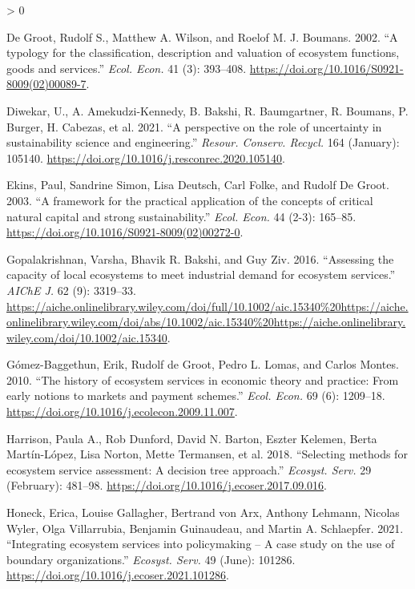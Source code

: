 \documentclass[
]{article}
\newlength{\cslhangindent}
\newenvironment{CSLReferences}[2] %
 {%
  \setlength{\parindent}{0pt}
  \ifodd #1 \everypar{\setlength{\hangindent}{\cslhangindent}}\ignorespaces\fi
  \ifnum #2 > 0
  \setlength{\parskip}{#2\baselineskip}
  \fi
 }%
 {}
\begin{document}
\begin{CSLReferences}{1}{0}
\leavevmode\hypertarget{ref-DeGroot2002}{}%
De Groot, Rudolf S., Matthew A. Wilson, and Roelof M. J. Boumans. 2002. {``{A typology for the classification, description and valuation of ecosystem functions, goods and services}.''} \emph{Ecol. Econ.} 41 (3): 393--408. \url{https://doi.org/10.1016/S0921-8009(02)00089-7}.

\leavevmode\hypertarget{ref-Diwekar2021}{}%
Diwekar, U., A. Amekudzi-Kennedy, B. Bakshi, R. Baumgartner, R. Boumans, P. Burger, H. Cabezas, et al. 2021. {``{A perspective on the role of uncertainty in sustainability science and engineering}.''} \emph{Resour. Conserv. Recycl.} 164 (January): 105140. \url{https://doi.org/10.1016/j.resconrec.2020.105140}.

\leavevmode\hypertarget{ref-Ekins2003}{}%
Ekins, Paul, Sandrine Simon, Lisa Deutsch, Carl Folke, and Rudolf De Groot. 2003. {``{A framework for the practical application of the concepts of critical natural capital and strong sustainability}.''} \emph{Ecol. Econ.} 44 (2-3): 165--85. \url{https://doi.org/10.1016/S0921-8009(02)00272-0}.

\leavevmode\hypertarget{ref-Gopalakrishnan2016}{}%
Gopalakrishnan, Varsha, Bhavik R. Bakshi, and Guy Ziv. 2016. {``{Assessing the capacity of local ecosystems to meet industrial demand for ecosystem services}.''} \emph{AIChE J.} 62 (9): 3319--33. \url{https://aiche.onlinelibrary.wiley.com/doi/full/10.1002/aic.15340\%20https://aiche.onlinelibrary.wiley.com/doi/abs/10.1002/aic.15340\%20https://aiche.onlinelibrary.wiley.com/doi/10.1002/aic.15340}.

\leavevmode\hypertarget{ref-Gomez-Baggethun2010}{}%
Gómez-Baggethun, Erik, Rudolf de Groot, Pedro L. Lomas, and Carlos Montes. 2010. {``{The history of ecosystem services in economic theory and practice: From early notions to markets and payment schemes}.''} \emph{Ecol. Econ.} 69 (6): 1209--18. \url{https://doi.org/10.1016/j.ecolecon.2009.11.007}.

\leavevmode\hypertarget{ref-Harrison2018}{}%
Harrison, Paula A., Rob Dunford, David N. Barton, Eszter Kelemen, Berta Martín-López, Lisa Norton, Mette Termansen, et al. 2018. {``{Selecting methods for ecosystem service assessment: A decision tree approach}.''} \emph{Ecosyst. Serv.} 29 (February): 481--98. \url{https://doi.org/10.1016/j.ecoser.2017.09.016}.

\leavevmode\hypertarget{ref-Honeck2021}{}%
Honeck, Erica, Louise Gallagher, Bertrand von Arx, Anthony Lehmann, Nicolas Wyler, Olga Villarrubia, Benjamin Guinaudeau, and Martin A. Schlaepfer. 2021. {``{Integrating ecosystem services into policymaking -- A case study on the use of boundary organizations}.''} \emph{Ecosyst. Serv.} 49 (June): 101286. \url{https://doi.org/10.1016/j.ecoser.2021.101286}.


\end{CSLReferences}
\end{document}
